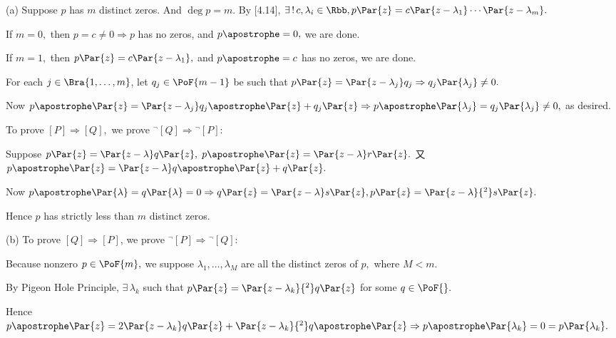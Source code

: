 \par\quad
(a) Suppose $p$ has $m$ distinct zeros. And $\deg p=m.$ By [4.14], $\exists\,!\,c,\lambda_i\in\Rbb,p\Par{z}=c\Par{z-\lambda_1}\cdots\Par{z-\lambda_m}.$\par\vspace{2pt}\quad\Ha
If $m=0,$ then $p=c\neq 0\Rightarrow p$ has no zeros, and $p\apostrophe=0,$ we are done.\par\quad\Ha
If $m=1,$ then $p\Par{z}=c\Par{z-\lambda_1},$ and $p\apostrophe=c$ has no zeros, we are done.\par\vspace{2pt}\quad\Ha
For each $j\in\Bra{1,\dots,m}$, let $q_j\in\PoF{m-1}$ be such that ${p\Par{z}}={\Par{z-\lambda_j}}q_j\Rightarrow q_j\Par{\lambda_j}\neq 0.$\par\vspace{2pt}\quad\Ha
Now $p\apostrophe\Par{z}=\Par{z-\lambda_j}q_j\apostrophe\Par{z}+q_j\Par{z}\Rightarrow p\apostrophe\Par{\lambda_j}=q_j\Par{\lambda_j}\neq 0,$ as desired.\par\vspace{6pt}\quad\Ha
\Or To prove $[P]\Rightarrow[Q],$ we prove ${}^{\neg}[Q]\Rightarrow{}{^\neg}[P]$:\par\quad\Ha
Suppose $p\Par{z}=\Par{z-\lambda}q\Par{z},\;p\apostrophe\Par{z}=\Par{z-\lambda}r\Par{z}.$ 又 $p\apostrophe\Par{z}=\Par{z-\lambda}q\apostrophe\Par{z}+q\Par{z}.$\vspace{2pt}\par\quad\Ha
Now $p\apostrophe\Par{\lambda}=q\Par{\lambda}=0\Rightarrow q\Par{z}=\Par{z-\lambda}s\Par{z},p\Par{z}=\Par{z-\lambda}{^2}s\Par{z}.$\vspace{2pt}\par\quad\Ha
Hence $p$ has strictly less than $m$ distinct zeros.\par\vspace{6pt}\quad
(b) To prove $[Q]\Rightarrow[P]$, we prove ${}^{\neg}[P]\Rightarrow{}{^\neg}[Q]$:\par\quad\Hb
Because nonzero $p\in\PoF{m},$ we suppose $\lambda_1,\dots,\lambda_M$ are all the distinct zeros of $p,$ where $M<m.$\vspace{2pt}\par\quad\Hb
By Pigeon Hole Principle, $\exists\,\lambda_k$ such that $p\Par{z}=\Par{z-\lambda_k}{^{2}}q\Par{z}$ for some $q\in\PoF{}.$\vspace{3pt}\par\quad\Hb
Hence $p\apostrophe\Par{z}=2\Par{z-\lambda_k}q\Par{z}+\Par{z-\lambda_k}{^2}q\apostrophe\Par{z}\Rightarrow p\apostrophe\Par{\lambda_k}=0=p\Par{\lambda_k}.$\PfEnd
\SepLine

